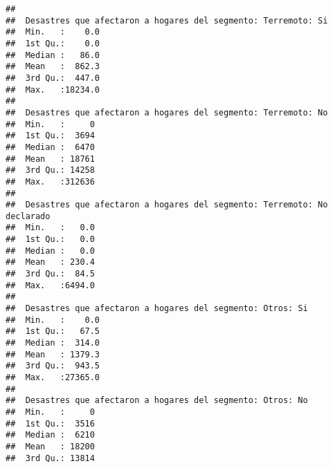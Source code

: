 \documentclass[11pt,]{article}
\begin{document}
\begin{verbatim}
##                                                                        
##  Desastres que afectaron a hogares del segmento: Terremoto: Si
##  Min.   :    0.0                                              
##  1st Qu.:    0.0                                              
##  Median :   86.0                                              
##  Mean   :  862.3                                              
##  3rd Qu.:  447.0                                              
##  Max.   :18234.0                                              
##                                                               
##  Desastres que afectaron a hogares del segmento: Terremoto: No
##  Min.   :     0                                               
##  1st Qu.:  3694                                               
##  Median :  6470                                               
##  Mean   : 18761                                               
##  3rd Qu.: 14258                                               
##  Max.   :312636                                               
##                                                               
##  Desastres que afectaron a hogares del segmento: Terremoto: No declarado
##  Min.   :   0.0                                                         
##  1st Qu.:   0.0                                                         
##  Median :   0.0                                                         
##  Mean   : 230.4                                                         
##  3rd Qu.:  84.5                                                         
##  Max.   :6494.0                                                         
##                                                                         
##  Desastres que afectaron a hogares del segmento: Otros: Si
##  Min.   :    0.0                                          
##  1st Qu.:   67.5                                          
##  Median :  314.0                                          
##  Mean   : 1379.3                                          
##  3rd Qu.:  943.5                                          
##  Max.   :27365.0                                          
##                                                           
##  Desastres que afectaron a hogares del segmento: Otros: No
##  Min.   :     0                                           
##  1st Qu.:  3516                                           
##  Median :  6210                                           
##  Mean   : 18200                                           
##  3rd Qu.: 13814                                           

\end{verbatim}
\end{document}
